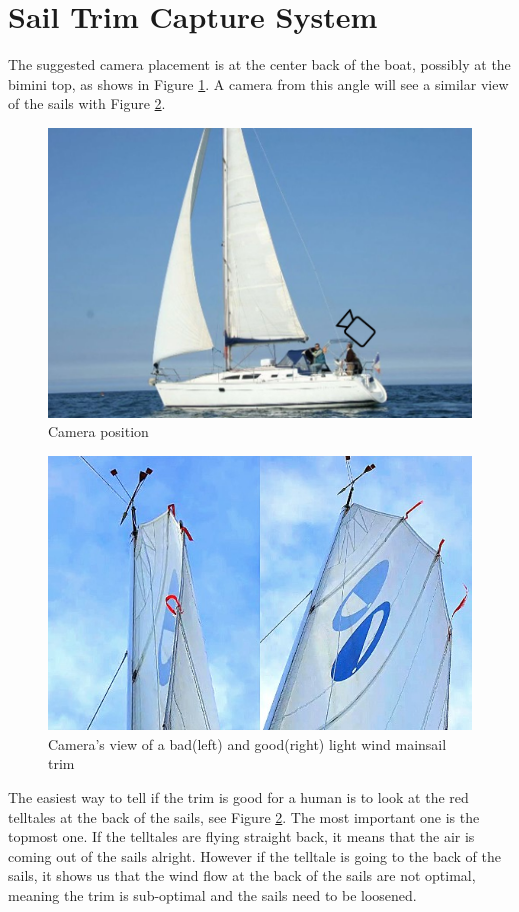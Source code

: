 \section{Sail Trim Capture System}

The suggested camera placement is at the center back of the boat, possibly at the bimini top, as shows in Figure \ref{fig:camera-pos}. A camera from this angle will see a similar view of the sails with Figure \ref{fig:telltales}.

\begin{figure}[h]
\centering
\includegraphics[width = 0.7\hsize]{figures/sail-trim-approach/camera-position.png}
\caption{Camera position}
\label{fig:camera-pos}
\end{figure}

\begin{figure}[h]
\centering
\includegraphics[width = 0.8\hsize]{figures/sail-trim-approach/telltales.jpg}
\caption{Camera's view of a bad(left) and good(right) light wind mainsail trim \cite{img:telltales}}
\label{fig:telltales}
\end{figure}

The easiest way to tell if the trim is good for a human is to look at the red telltales at the back of the sails, see Figure \ref{fig:telltales}. The most important one is the topmost one. If the telltales are flying straight back, it means that the air is coming out of the sails alright. However if the telltale is going to the back of the sails, it shows us that the wind flow at the back of the sails are not optimal, meaning the trim is sub-optimal and the sails need to be loosened.

